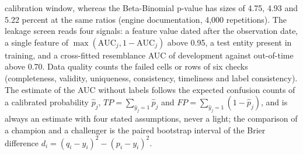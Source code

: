 calibration window, whereas the Beta-Binomial p-value has sizes of 4.75, 4.93 and 5.22 percent at the same ratios (engine documentation, 4,000 repetitions). The leakage screen reads four signals: a feature value dated after the observation date, a single feature of
$\max(\mathrm{AUC}_j,1-\mathrm{AUC}_j)$ above 0.95, a test entity present in training, and a cross-fitted resemblance AUC of development against out-of-time above 0.70. Data quality counts the failed cells or rows of six checks
(completeness, validity, uniqueness, consistency, timeliness and label consistency). The estimate of the AUC without labels follows the expected confusion counts of a calibrated probability $\hat p_j$,
$TP=\sum_{\hat y_j=1}\hat p_j$ and $FP=\sum_{\hat y_j=1}(1-\hat p_j)$, and is always an estimate with four stated assumptions, never a light; the comparison of a champion and a challenger is the paired bootstrap interval of the
Brier difference $d_i=(q_i-y_i)^2-(p_i-y_i)^2$.

